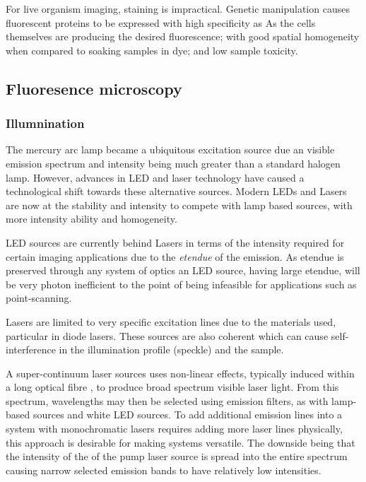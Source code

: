For live organism imaging, staining is impractical.
Genetic manipulation causes fluorescent proteins to be expressed with high specificity as
As the cells themselves are producing the desired fluorescence; with good spatial homogeneity when compared to soaking samples in dye; and low sample toxicity.


\subsection{Fluoresence microscopy}

\subsubsection{Illumnination}

The mercury arc lamp became a ubiquitous excitation source due an visible emission spectrum and intensity being much greater than a standard halogen lamp.
However, advances in LED and laser technology have caused a technological shift towards these alternative sources.
Modern LEDs and Lasers are now at the stability and intensity to compete with lamp based sources, with more intensity ability and homogeneity.

LED sources are currently behind Lasers in terms of the intensity required for certain imaging applications due to the \emph{etendue} of the emission.
As etendue is preserved through any system of optics an LED source, having large etendue, will be very photon inefficient to the point of being infeasible for applications such as point-scanning.

Lasers are limited to very specific excitation lines due to the materials used, particular in diode lasers.
These sources are also coherent which can cause self-interference in the illumination profile (speckle) and the sample.

A super-continuum laser sources uses non-linear effects, typically induced within a long optical fibre , to produce broad spectrum visible laser light.
From this spectrum, wavelengths may then be selected using emission filters, as with lamp-based sources and white LED sources.
To add additional emission lines into a system with monochromatic lasers requires adding more laser lines physically, this approach is desirable for making systems versatile.
The downside being that the intensity of the of the pump laser source is spread into the entire spectrum causing narrow selected emission bands to have relatively low intensities.


